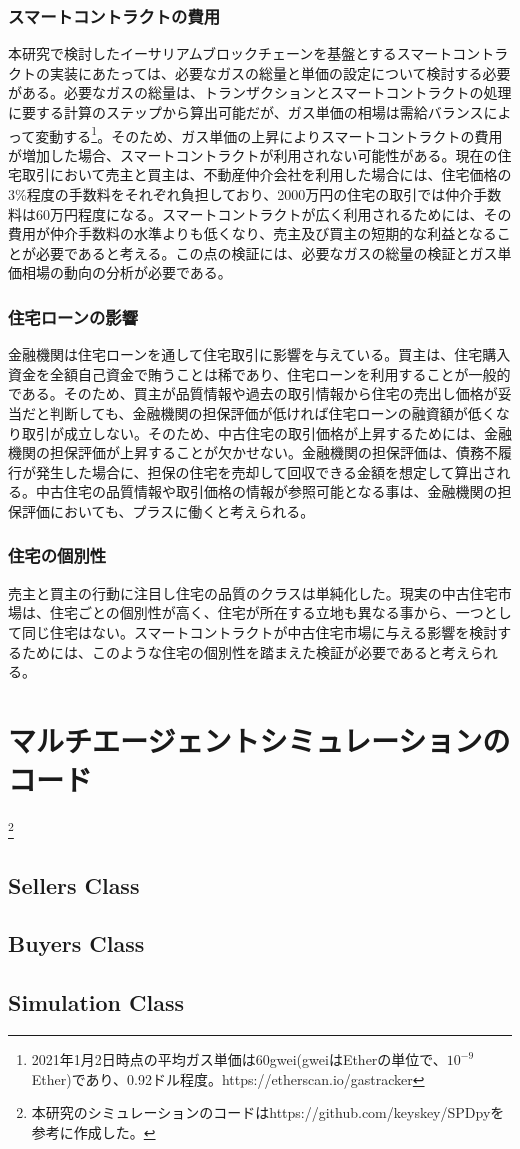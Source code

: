 \documentclass[a4paper,fontsize=11pt,report,notitlepage,line_length=38zw,number_of_lines=40,dvipdfmx]{jlreq}
\begin{document}
\subsection{スマートコントラクトの費用}
本研究で検討したイーサリアムブロックチェーンを基盤とするスマートコントラクトの実装にあたっては、必要なガスの総量と単価の設定について検討する必要がある。必要なガスの総量は、トランザクションとスマートコントラクトの処理に要する計算のステップから算出可能だが、ガス単価の相場は需給バランスによって変動する\footnote{2021年1月2日時点の平均ガス単価は60gwei(gweiはEtherの単位で、$10^{-9}$Ether)であり、0.92ドル程度。https://etherscan.io/gastracker}。そのため、ガス単価の上昇によりスマートコントラクトの費用が増加した場合、スマートコントラクトが利用されない可能性がある。現在の住宅取引において売主と買主は、不動産仲介会社を利用した場合には、住宅価格の3\%程度の手数料をそれぞれ負担しており、2000万円の住宅の取引では仲介手数料は60万円程度になる。スマートコントラクトが広く利用されるためには、その費用が仲介手数料の水準よりも低くなり、売主及び買主の短期的な利益となることが必要であると考える。この点の検証には、必要なガスの総量の検証とガス単価相場の動向の分析が必要である。

\subsection{住宅ローンの影響}
金融機関は住宅ローンを通して住宅取引に影響を与えている。買主は、住宅購入資金を全額自己資金で賄うことは稀であり、住宅ローンを利用することが一般的である。そのため、買主が品質情報や過去の取引情報から住宅の売出し価格が妥当だと判断しても、金融機関の担保評価が低ければ住宅ローンの融資額が低くなり取引が成立しない。そのため、中古住宅の取引価格が上昇するためには、金融機関の担保評価が上昇することが欠かせない。金融機関の担保評価は、債務不履行が発生した場合に、担保の住宅を売却して回収できる金額を想定して算出される。中古住宅の品質情報や取引価格の情報が参照可能となる事は、金融機関の担保評価においても、プラスに働くと考えられる。

\subsection{住宅の個別性}
売主と買主の行動に注目し住宅の品質のクラスは単純化した。現実の中古住宅市場は、住宅ごとの個別性が高く、住宅が所在する立地も異なる事から、一つとして同じ住宅はない。スマートコントラクトが中古住宅市場に与える影響を検討するためには、このような住宅の個別性を踏まえた検証が必要であると考えられる。





\appendix
\chapter{マルチエージェントシミュレーションのコード}
\footnote{本研究のシミュレーションのコードはhttps://github.com/keyskey/SPDpyを参考に作成した。}
\section{Sellers Class}
\section{Buyers Class}
\section{Simulation Class}
\end{document}
